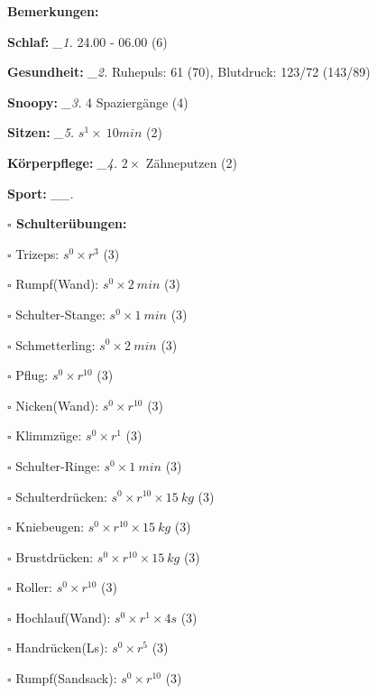 \documentclass[10pt,a4paper]{article}
\newcommand\prop[1] {{\color {alizarin} {\bf #1}}}             %
\newcommand\mand[1] {{\color {burntorange} {\bf #1}}}          %
\newcommand\topspace{\vskip -15pt \hskip 20pt}
\newcommand\n[1] { {\sl #1.} \hskip 5pt }
\begin{document}
\begin{mdframed}[style=daystyle]
  \begin{labeling}{{\mand {Bemerkungen:}}}
    \setlength\itemsep{-3pt}
  \item[{\mand {Schlaf:}}]        \n{\_1} 24.00 - 06.00 (6)
  \item[{\mand {Gesundheit:}}]    \n{\_2} Ruhepuls: 61 (70), Blutdruck: 123/72 (143/89)
  \item[{\mand {Snoopy:}}]        \n{\_3} 4 Spaziergänge (4) 
  \item[{\mand {Sitzen:}}]        \n{\_5} $s^1 \times\ 10 min$ (2)
  \item[{\mand {Körperpflege:}}]  \n{\_4} $2 \times$ Zähneputzen (2)
  \item[{\mand {Sport:}}]        \n{\_\_}
    \topspace
    \begin{minipage}{0.75\textwidth}  
      \begin{labeling}{\prop {$\square$ {Schulterübungen:}}} 
        \setlength\itemsep{-3pt}
      \item[$\square$ Trizeps:]         $s^0 \times r^{3}$ (3)
      \item[$\square$ Rumpf(Wand):]     $s^0 \times 2\ min$ (3)
      \item[$\square$ Schulter-Stange:] $s^0 \times 1\ min$ (3)
      \item[$\square$ Schmetterling:]   $s^0 \times 2\ min$ (3)
      \item[$\square$ Pflug:]           $s^0 \times r^{10}$ (3)
      \item[$\square$ Nicken(Wand):]    $s^0 \times r^{10}$ (3)
      \item[$\square$ Klimmzüge:]       $s^0 \times r^1$ (3)
      \item[$\square$ Schulter-Ringe:]  $s^0 \times 1\ min$ (3)
      \item[$\square$ Schulterdrücken:] $s^0 \times r^{10} \times 15\ kg$ (3)
      \item[$\square$ Kniebeugen:]      $s^0 \times r^{10} \times 15\ kg$ (3)
      \item[$\square$ Brustdrücken:]    $s^0 \times r^{10} \times 15\ kg$ (3)
      \item[$\square$ Roller:]          $s^0 \times r^{10}$ (3)
      \item[$\square$ Hochlauf(Wand):]  $s^0 \times r^{1} \times 4s$ (3)
      \item[$\square$ Handrücken(Ls):]  $s^0 \times r^{5}$ (3)
      \item[$\square$ Rumpf(Sandsack):] $s^0 \times r^{10}$ (3)

\end{labeling}
\end{minipage}
\end{labeling}
\end{mdframed}
\end{document}
